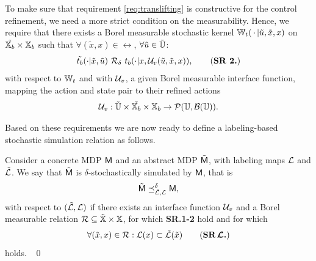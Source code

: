 \documentclass{ifacconf}
\begin{document}
To make sure that requirement \eqref{req:translifting} is constructive for the control refinement, we need a more strict condition on the measurability.  Hence, we require that 
  there exists a Borel measurable stochastic kernel $\mathbb{W}_{t}(\,\cdot\,{\mid} \tilde u,\tilde x,x)$ on $\tilde {{{\mathbb{X}}_b}}\times{{\mathbb{X}}_b}$ such that $\forall (\tilde x,x)\in \rel$, $\forall \tilde u\in\tilde {{\mathbb{U}}}$:
\begin{equation}\tilde \trb(\cdot| \tilde x, \tilde u)\ \bar \rel_\delta \  \trb(\cdot| x, \InF(\tilde u,\tilde x,x)),\tag{\textbf{SR 2.}}\end{equation} with respect to $\mathbb{W}_{t}$ and with $\mathcal{U}_{v}$, a given Borel measurable  interface function, mapping the action and state pair to their refined actions
\begin{align*}\mathcal{U}_{v}: \tilde {{\mathbb{U}}}\times \tilde {{{\mathbb{X}}_b}}\times{{\mathbb{X}}_b} \rightarrow \mathcal{P}({\mathbb{U}},\mathcal B({\mathbb{U}})). \end{align*}

Based on these requirements we are now ready to define a labeling-based stochastic simulation relation as follows. 

\begin{definition}\label{def:apbsim}
Consider a concrete MDP $\mathsf{M}$ and an abstract  MDP $\tilde{\mathsf{M}}$, with labeling maps $\mathcal{L}$ and  $\tilde{\mathcal{L}}$.   
We say that	$\tilde{\mathsf{M}}$ is $\delta$-stochastically simulated by $\mathsf{M}$, that is $$\tilde{\mathsf{M}}\preceq^{\delta}_{\tilde{\mathcal{L}},\mathcal{L}}\mathsf{M},$$ with respect to $(\tilde{\mathcal{L}},\mathcal{L})$  if there exists an interface function $\mathcal{U}_{v}$ and
	a Borel measurable relation $\mathcal{R}\subseteq \tilde {{\mathbb{X}}}\times {\mathbb{X}}$, for which \textbf{SR.1-2} hold and for which 	\begin{equation}
	  \forall (\tilde x,x)\in \rel:  \Labset(x)\subset \tilde{\Labset}(\tilde x)
\tag{\textbf{SR$\,\boldsymbol{\CA{L}}$.}}
	\end{equation} 
holds. \hfill\mbox{ }\qed
\end{definition}
\end{document}
